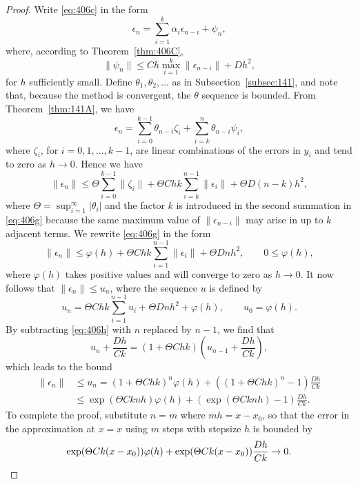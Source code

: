 \begin{proof}
Write \eqref{eq:406c} in the form
\[
\epsilon_n = \sum_{i=1}^k \alpha_i \epsilon_{n-i} + \psi_n,
\]
where, according to Theorem~\ref{thm:406C},
\[
\|\psi_n\| \leq C h \max_{i=1}^k \|\epsilon_{n-i}\| + D h^2,
\]
for $h$ sufficiently small. Define $\theta_1, \theta_2, \dots$ as in Subsection~\ref{subsec:141}, and note that, because the method is convergent, the $\theta$ sequence is bounded. From Theorem~\ref{thm:141A}, we have
\[
\epsilon_n = \sum_{i=0}^{k-1} \theta_{n-i} \zeta_i + \sum_{i=k}^n \theta_{n-i} \psi_i,
\]
where $\zeta_i$, for $i = 0, 1, \dots, k-1$, are linear combinations of the errors in $y_i$ and tend to zero as $h \to 0$. Hence we have
\begin{equation} \label{eq:406g}
\|\epsilon_n\| \leq \Theta \sum_{i=0}^{k-1} \|\zeta_i\| + \Theta C h k \sum_{i=k}^{n-1} \|\epsilon_i\| + \Theta D (n-k) h^2,
\end{equation}
where $\Theta = \sup_{i=1}^\infty |\theta_i|$ and the factor $k$ is introduced in the second summation in \eqref{eq:406g} because the same maximum value of $\|\epsilon_{n-i}\|$ may arise in up to $k$ adjacent terms. We rewrite \eqref{eq:406g} in the form
\[
\|\epsilon_n\| \leq \varphi(h) + \Theta C h k \sum_{i=1}^{n-1} \|\epsilon_i\| + \Theta D n h^2, \qquad 0 \leq \varphi(h),
\]
where $\varphi(h)$ takes positive values and will converge to zero as $h \to 0$. It now follows that $\|\epsilon_n\| \leq u_n$, where the sequence $u$ is defined by
\begin{equation} \label{eq:406h}
u_n = \Theta C h k \sum_{i=1}^{n-1} u_i + \Theta D n h^2 + \varphi(h), \qquad u_0 = \varphi(h).
\end{equation}
By subtracting \eqref{eq:406h} with $n$ replaced by $n-1$, we find that
\[
u_n + \frac{D h}{C k} = (1 + \Theta C h k) \left( u_{n-1} + \frac{D h}{C k} \right),
\]
which leads to the bound
\begin{align*}
\|\epsilon_n\| &\leq u_n = (1 + \Theta C h k)^n \varphi(h) + \left( (1 + \Theta C h k)^n - 1 \right) \frac{D h}{C k} \\
&\leq \exp(\Theta C k n h) \varphi(h) + \left( \exp(\Theta C k n h) - 1 \right) \frac{D h}{C k}.
\end{align*}
To complete the proof, substitute $n = m$ where $m h = x - x_0$, so that the error in the approximation at $x = x$ using $m$ steps with stepsize $h$ is bounded by
\[
\exp(\Theta C k (x - x_0)) \varphi(h) + \exp(\Theta C k (x - x_0)) \frac{D h}{C k} \to 0. \qedhere
\]
\end{proof}

